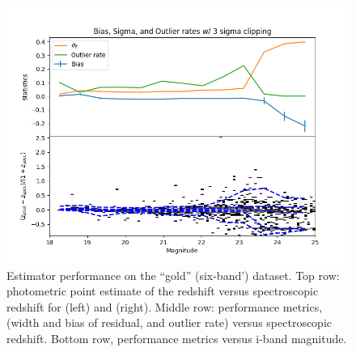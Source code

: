 \begin{figure}
    \includegraphics[width=0.45\linewidth]{figures/biweight_stats_v_mag_bpz.png}    
    \caption{Estimator performance on the ``gold'' (six-band') dataset.  Top row: photometric point estimate of the redshift versus spectroscopic redshift for  (left) and  (right).   Middle row: performance metrics, (width and bias of residual, and outlier rate) versus spectroscopic redshift.    Bottom row, performance metrics versus i-band magnitude.}
    \label{fig:perf_gold}
\end{figure}

